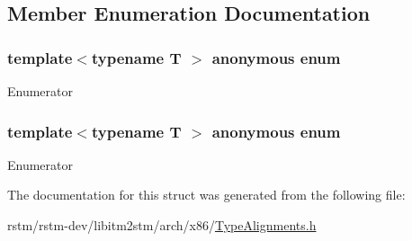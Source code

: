 \subsection{Member Enumeration Documentation}
\hypertarget{structitm2stm_1_1Aligned_a3945b6040410f550bca6bd1d6e303ae5}{\subsubsection[{anonymous enum}]{\setlength{\rightskip}{0pt plus 5cm}template$<$typename T $>$ anonymous enum}}\label{structitm2stm_1_1Aligned_a3945b6040410f550bca6bd1d6e303ae5}
\begin{Desc}
\item[Enumerator]\par
\begin{description}
\item[{\em 
\hypertarget{structitm2stm_1_1Aligned_af59843d96eb77039f855282ceaa5606da1d46bd7a44a703f34709d6032cd8afd8}{value}\label{structitm2stm_1_1Aligned_af59843d96eb77039f855282ceaa5606da1d46bd7a44a703f34709d6032cd8afd8}
}]\end{description}
\end{Desc}
\hypertarget{structitm2stm_1_1Aligned_af59843d96eb77039f855282ceaa5606d}{\subsubsection[{anonymous enum}]{\setlength{\rightskip}{0pt plus 5cm}template$<$typename T $>$ anonymous enum}}\label{structitm2stm_1_1Aligned_af59843d96eb77039f855282ceaa5606d}
\begin{Desc}
\item[Enumerator]\par
\begin{description}
\item[{\em 
\hypertarget{structitm2stm_1_1Aligned_af59843d96eb77039f855282ceaa5606da1d46bd7a44a703f34709d6032cd8afd8}{value}\label{structitm2stm_1_1Aligned_af59843d96eb77039f855282ceaa5606da1d46bd7a44a703f34709d6032cd8afd8}
}]\end{description}
\end{Desc}


The documentation for this struct was generated from the following file\-:\begin{DoxyCompactItemize}
\item 
rstm/rstm-\/dev/libitm2stm/arch/x86/\hyperlink{TypeAlignments_8h}{Type\-Alignments.\-h}\end{DoxyCompactItemize}
